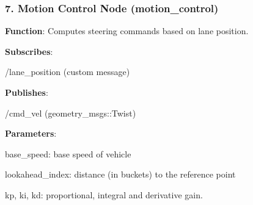 \subsubsection*{7. Motion Control Node ({\ttfamily motion\+\_\+control})}

{\bfseries Function}\+: Computes steering commands based on lane position.
\begin{DoxyItemize}
\item {\bfseries Subscribes}\+:
\begin{DoxyItemize}
\item {\ttfamily /lane\+\_\+position} (custom message)
\end{DoxyItemize}
\item {\bfseries Publishes}\+:
\begin{DoxyItemize}
\item {\ttfamily /cmd\+\_\+vel} (geometry\+\_\+msgs\+::\+Twist)
\end{DoxyItemize}
\item {\bfseries Parameters}\+:
\begin{DoxyItemize}
\item {\ttfamily base\+\_\+speed}\+: base speed of vehicle
\item {\ttfamily lookahead\+\_\+index}\+: distance (in buckets) to the reference point
\item {\ttfamily kp}, {\ttfamily ki}, {\ttfamily kd}\+: proportional, integral and derivative gain. 
\end{DoxyItemize}
\end{DoxyItemize}